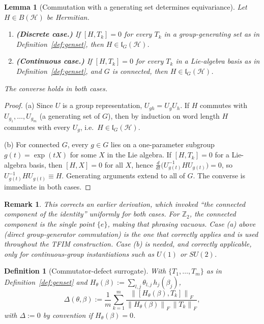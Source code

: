 \documentclass[pdflatex,sn-mathphys-num]{sn-jnl}
\theoremstyle{thmstyleone}
\newtheorem{lemma}[theorem]{Lemma}
\theoremstyle{thmstyletwo}
\newtheorem{remark}{Remark}
\theoremstyle{thmstylethree}
\newtheorem{definition}{Definition}
\newcommand{\Hil}{\mathcal{H}}
\newcommand{\lG}{\mathfrak{l}_G(\Hil)}
\newcommand{\fronorm}[1]{\left\lVert #1 \right\rVert_{F}}
\begin{document}
\begin{lemma}[Commutation with a generating set determines equivariance]
\label{lem:genset}
Let $H \in B(\Hil)$ be Hermitian.
\begin{enumerate}[label=(\alph*), leftmargin=1.4em, itemsep=1pt, topsep=2pt]
\item \textbf{(Discrete case.)} If $[H,T_k]=0$ for every $T_k$ in a group-generating set as in Definition~\ref{def:genset}, then $H \in \lG$.
\item \textbf{(Continuous case.)} If $[H,T_k]=0$ for every $T_k$ in a Lie-algebra basis as in Definition~\ref{def:genset}, and $G$ is connected, then $H \in \lG$.
\end{enumerate}
The converse holds in both cases.
\end{lemma}
\begin{proof}
(a) Since $U$ is a group representation, $U_{gh} = U_g U_h$. If $H$ commutes with $U_{g_1},\ldots,U_{g_m}$ (a generating set of $G$), then by induction on word length $H$ commutes with every $U_g$, i.e.\ $H \in \lG$.

(b) For connected $G$, every $g \in G$ lies on a one-parameter subgroup $g(t) = \exp(tX)$ for some $X$ in the Lie algebra. If $[H,T_k]=0$ for a Lie-algebra basis, then $[H,X]=0$ for all $X$, hence $\frac{d}{dt}\big(U_{g(t)}^{-1} H U_{g(t)}\big) = 0$, so $U_{g(t)}^{-1} H U_{g(t)} \equiv H$. Generating arguments extend to all of $G$. The converse is immediate in both cases.
\end{proof}

\begin{remark}
\label{rem:correction}
This corrects an earlier derivation, which invoked ``the connected component of the identity'' uniformly for both cases. For $\mathbb{Z}_2$, the connected component is the single point $\{e\}$, making that phrasing vacuous. Case (a) above (direct group-generator commutation) is the one that correctly applies and is used throughout the TFIM construction. Case (b) is needed, and correctly applicable, only for continuous-group instantiations such as $U(1)$ or $SU(2)$.
\end{remark}

\begin{definition}[Commutator-defect surrogate]
\label{def:defect}
With $\{T_1,\ldots,T_m\}$ as in Definition~\ref{def:genset} and $H_\theta(\beta) := \sum_{l,j} \theta_{l,j}\, h_j(\beta_j)$,
\begin{equation}
\Delta(\theta,\beta) := \frac{1}{m}\sum_{k=1}^{m} \frac{\fronorm{[H_\theta(\beta), T_k]}}{\fronorm{H_\theta(\beta)}\,\fronorm{T_k}}, \label{eq:8}
\end{equation}
with $\Delta := 0$ by convention if $H_\theta(\beta) = 0$.
\end{definition}
\end{document}
